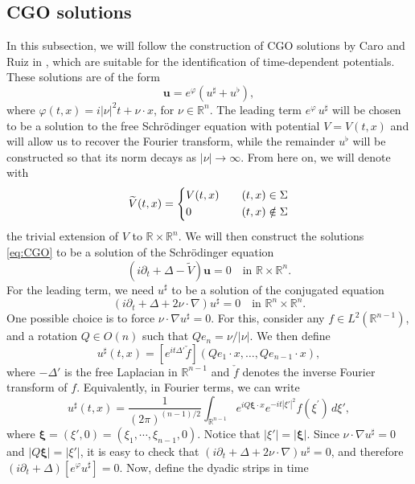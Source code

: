 \documentclass[10pt,a4paper]{amsart}
\theoremstyle{remark}
\theoremstyle{definition}
\newcommand{\R}{\mathbb{R}}
\def\wt{\widetilde}
\def\bs{\boldsymbol}
\begin{document}
\subsection{CGO solutions}\label{sect: CGO}
In this subsection, we will follow the construction of CGO solutions by Caro and Ruiz in \cite{zbMATH07801151}, which are suitable for the identification of time-dependent potentials. These solutions are of the form
%
\begin{equation}\label{eq:CGO}
	\mathbf{u}=e^\varphi(u^\sharp+u^\flat),
\end{equation}
%
where $\varphi(t,x)=i|\nu|^2t+\nu\cdot x$, for $\nu\in\R^n$. The leading term $e^\varphi\,u^\sharp$ will be chosen to be a solution to the free Schr\"odinger equation with potential $V=V(t,x)$ and will allow us to recover the Fourier transform, while the remainder $u^\flat$ will be constructed so that its norm decays as $|\nu|\to\infty$. From here on, we will denote with
%
\[
\wt{V}(t, x)=
\begin{dcases}
 V(t, x) \quad &(t, x) \in \Sigma \\
 0  &(t, x) \notin \Sigma
\end{dcases}
\]
%
the trivial extension of $V$ to $\R\times\R^n$. We will then construct the solutions \eqref{eq:CGO} to be a solution of the Schr\"odinger equation
%
\begin{equation}\label{eq: schrodinger_R}
	(i\partial_t + \Delta - \wt V) \mathbf{u} =0 \quad \textrm{in }\R\times\R^n.
\end{equation}
%
For the leading term, we need $u^\sharp$ to be a solution of the conjugated equation 
%
\[
(i\partial_t+\Delta+2\nu\cdot\nabla)u^\sharp=0 \quad \text{in } \R^n\times \R^n.
\]
%
One possible choice is to force $\nu\cdot \nabla u^\sharp=0$. For this, consider any $f\in L^2(\R^{n-1})$, and a rotation $Q\in O(n)$ such that $Qe_n=\nu/|\nu|$. We then define
\[
u^\sharp(t,x)=[e^{it\Delta'}\check f](Qe_1\cdot x,\ldots, Qe_{n-1}\cdot x),
\]
where $-\Delta'$ is the free Laplacian in $\R^{n-1}$ and $\check f$ denotes the inverse Fourier transform of $f$.
%
Equivalently, in Fourier terms, we can write 
%
\[
u^\sharp(t,x)=\frac{1}{(2\pi)^{(n-1)/2}}\int_{\R^{n-1}}e^{i Q \bs{\xi} \cdot x}e^{-it|\xi'|^2} f(\xi^\prime)\,d\xi', 
\]
%
where $\boldsymbol{\xi} = (\xi', 0)=(\xi_1, \cdots, \xi_{n-1}, 0)$. Notice that $|\xi'|=|\bs{\xi}|$. 
Since $\nu\cdot \nabla u^{\sharp}=0$  and $|Q \bs{\xi}| = |\xi'|$,
it is easy to check that $(i\partial_t+\Delta+2\nu\cdot\nabla)u^\sharp=0$, and therefore $(i\partial_t+\Delta)[e^\varphi u^\sharp]=0$. Now, define the dyadic strips in time
\end{document}
